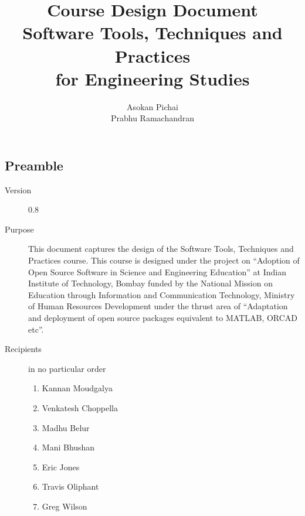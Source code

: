 \documentclass{article}
\title{Course Design Document\\Software Tools, Techniques and Practices\\for Engineering Studies}
\author{Asokan Pichai\\Prabhu Ramachandran}
\date{}
\begin{document}
\maketitle

\subsection{Preamble} 
\begin{description}
  \item[Version] 0.8
  \item[Purpose] This document captures the design of the Software
      Tools, Techniques and Practices course. This course is designed
      under the project on ``Adoption of Open Source Software in Science
      and Engineering Education'' at Indian Institute of Technology,
      Bombay funded by the National Mission on Education through
      Information and Communication Technology, Ministry of Human
      Resources Development under the thrust area of ``Adaptation and
      deployment of open source packages equivalent to MATLAB, ORCAD etc''.

  \item[Recipients] in no particular order
  \begin{enumerate}
     \item Kannan Moudgalya
     \item Venkatesh Choppella
     \item Madhu Belur
     \item Mani Bhushan
     \item Eric Jones
     \item Travis Oliphant
     \item Greg Wilson
  \end{enumerate}
\end{description}
\newpage
\end{document}
